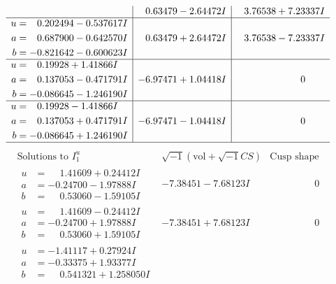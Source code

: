 \documentclass[1p]{elsarticle_modified}
\theoremstyle{definition}
\newcommand{\I}{\sqrt{-1}}
\begin{document}
$$\begin{array}{c|c|c}
 & \phantom{-}0.63479 - 2.64472 I & \phantom{-}3.76538 + 7.23337 I \\ \hline\begin{aligned}
u &= \phantom{-}0.202494 - 0.537617 I \\
a &= \phantom{-}0.687900 - 0.642570 I \\
b &= -0.821642 - 0.600623 I\end{aligned}
 & \phantom{-}0.63479 + 2.64472 I & \phantom{-}3.76538 - 7.23337 I \\ \hline\begin{aligned}
u &= \phantom{-}0.19928 + 1.41866 I \\
a &= \phantom{-}0.137053 - 0.471791 I \\
b &= -0.086645 - 1.246190 I\end{aligned}
 & -6.97471 + 1.04418 I & \phantom{-0.000000 } 0 \\ \hline\begin{aligned}
u &= \phantom{-}0.19928 - 1.41866 I \\
a &= \phantom{-}0.137053 + 0.471791 I \\
b &= -0.086645 + 1.246190 I\end{aligned}
 & -6.97471 - 1.04418 I & \phantom{-0.000000 } 0\\
 \hline 
 \end{array}$$\newpage$$\begin{array}{c|c|c}  
\text{Solutions to }I^u_{1}& \I (\text{vol} + \sqrt{-1}CS) & \text{Cusp shape}\\
 \hline 
\begin{aligned}
u &= \phantom{-}1.41609 + 0.24412 I \\
a &= -0.24700 - 1.97888 I \\
b &= \phantom{-}0.53060 - 1.59105 I\end{aligned}
 & -7.38451 - 7.68123 I & \phantom{-0.000000 } 0 \\ \hline\begin{aligned}
u &= \phantom{-}1.41609 - 0.24412 I \\
a &= -0.24700 + 1.97888 I \\
b &= \phantom{-}0.53060 + 1.59105 I\end{aligned}
 & -7.38451 + 7.68123 I & \phantom{-0.000000 } 0 \\ \hline\begin{aligned}
u &= -1.41117 + 0.27924 I \\
a &= -0.33375 + 1.93377 I \\
b &= \phantom{-}0.541321 + 1.258050 I\end{aligned}

\end{array}$$
\end{document}
